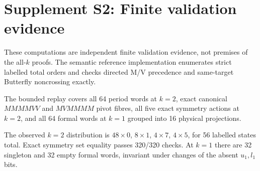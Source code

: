 \documentclass[11pt]{article}
\begin{document}
\section*{Supplement S2: Finite validation evidence}
These computations are independent finite validation evidence, not premises of the all-$k$ proofs. The semantic reference implementation enumerates strict labelled total orders and checks directed M/V precedence and same-target Butterfly noncrossing exactly.

The bounded replay covers all 64 period words at $k=2$, exact canonical $MMMMVV$ and $MVMMMM$ pivot fibres, all five exact symmetry actions at $k=2$, and all 64 formal words at $k=1$ grouped into 16 physical projections.

The observed $k=2$ distribution is $48\times0$, $8\times1$, $4\times7$, $4\times5$, for 56 labelled states total. Exact symmetry set equality passes 320/320 checks. At $k=1$ there are 32 singleton and 32 empty formal words, invariant under changes of the absent $u_1,l_1$ bits.
\end{document}
